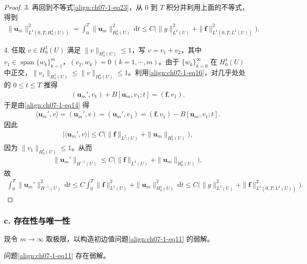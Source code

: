 \documentclass[../../main.tex]{subfiles}
\begin{document}
\begin{proof}
3. 再回到不等式\eqref{align:ch07-1-eq23}，从 $0$ 到 $T$ 积分并利用上面的不等式，得到
\begin{align*}
\|\mathbf{u}_m\|_{L^2(0,T;H^1_0(U))}^2 = \int_0^T \|\mathbf{u}_m\|_{H^1_0(U)}^2\,\mathrm{d}t \leqslant C\bigl(\|g\|_{L^2(U)}^2+\|\mathbf{f}\|_{L^2(0,T;L^2(U))}^2\bigr).
\end{align*}

4. 任取 $v\in H^1_0(U)$ 满足 $\|v\|_{H^1_0(U)}\leqslant 1$，写 $v=v_1+v_2$，其中 $v_1\in\operatorname{span}\{w_k\}_{k=1}^m$，$(v_2,w_k)=0\ (k=1,\cdots,m)$。由于 $\{w_k\}_{k=0}^\infty$ 在 $H^1_0(U)$ 中正交，$\|v_1\|_{H^1_0(U)}\leqslant\|v\|_{H^1_0(U)}\leqslant 1$。利用\eqref{align:ch07-1-eq16}，对几乎处处的 $0\leqslant t\leqslant T$ 推得
\begin{align*}
(\mathbf{u}_m',v_1)+B[\mathbf{u}_m,v_1;t]=(\mathbf{f},v_1).
\end{align*}
于是由\eqref{align:ch07-1-eq14} 得
\begin{align*}
\langle\mathbf{u}_m',v\rangle = (\mathbf{u}_m',v) = (\mathbf{u}_m',v_1) = (\mathbf{f},v_1)-B[\mathbf{u}_m,v_1;t].
\end{align*}
因此
\begin{align*}
|\langle\mathbf{u}_m',v\rangle| \leqslant C\bigl(\|\mathbf{f}\|_{L^2(U)}+\|\mathbf{u}_m\|_{H^1_0(U)}\bigr),
\end{align*}
因为 $\|v_1\|_{H^1_0(U)}\leqslant 1$。从而
\begin{align*}
\|\mathbf{u}_m'\|_{H^{-1}(U)} \leqslant C\bigl(\|\mathbf{f}\|_{L^2(U)}+\|\mathbf{u}_m\|_{H^1_0(U)}\bigr),
\end{align*}
故
\begin{align*}
\int_0^T \|\mathbf{u}_m'\|_{H^{-1}(U)}^2\,\mathrm{d}t \leqslant C\int_0^T \|\mathbf{f}\|_{L^2(U)}^2+\|\mathbf{u}_m\|_{H^1_0(U)}^2\,\mathrm{d}t
\leqslant C\bigl(\|g\|_{L^2(U)}^2+\|\mathbf{f}\|_{L^2(0,T;L^2(U))}^2\bigr).
\end{align*}
\end{proof}

\subsubsection*{c. 存在性与唯一性}

现令 $m\to\infty$ 取极限，以构造初边值问题\eqref{align:ch07-1-eq11} 的弱解。

\begin{theorem}[弱解的存在性。]\label{theorem:ch07-1-弱解的存在性}问题\eqref{align:ch07-1-eq11} 存在弱解。
\end{theorem}
\end{document}
